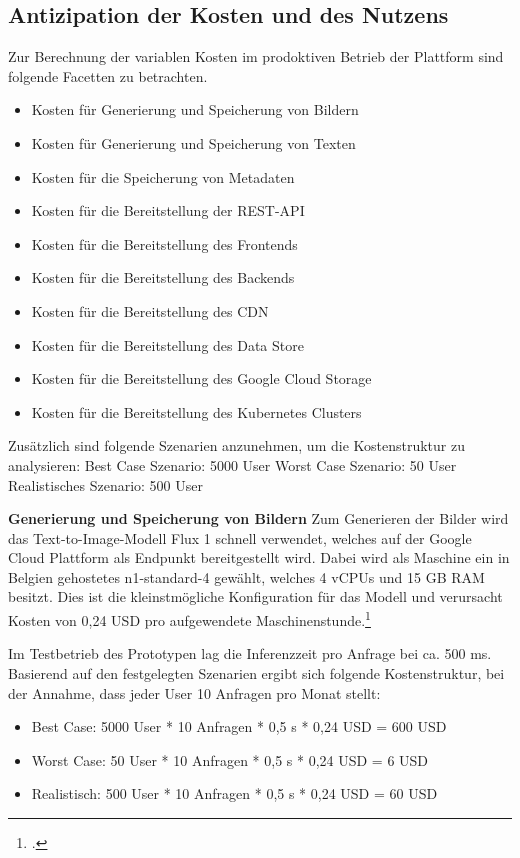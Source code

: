 \subsection{Antizipation der Kosten und des Nutzens}

Zur Berechnung der variablen Kosten im prodoktiven Betrieb der Plattform sind folgende Facetten zu betrachten.

\begin{itemize}
    \item Kosten für Generierung und Speicherung von Bildern
    \item Kosten für Generierung und Speicherung von Texten
    \item Kosten für die Speicherung von Metadaten
    \item Kosten für die Bereitstellung der REST-API
    \item Kosten für die Bereitstellung des Frontends
    \item Kosten für die Bereitstellung des Backends
    \item Kosten für die Bereitstellung des CDN
    \item Kosten für die Bereitstellung des Data Store
    \item Kosten für die Bereitstellung des Google Cloud Storage
    \item Kosten für die Bereitstellung des Kubernetes Clusters
\end{itemize}

Zusätzlich sind folgende Szenarien anzunehmen, um die Kostenstruktur zu analysieren:
Best Case Szenario: 5000 User
Worst Case Szenario: 50 User
Realistisches Szenario: 500 User

\textbf{Generierung und Speicherung von Bildern}
Zum Generieren der Bilder wird das Text-to-Image-Modell Flux 1 schnell verwendet, welches auf der Google Cloud Plattform als Endpunkt bereitgestellt wird.
Dabei wird als Maschine ein in Belgien gehostetes n1-standard-4 gewählt, welches 4 vCPUs und 15 GB RAM besitzt.
Dies ist die kleinstmögliche Konfiguration für das Modell und verursacht Kosten von 0,24 USD pro aufgewendete Maschinenstunde.\footcite{GoogleVertexAI2025}

Im Testbetrieb des Prototypen lag die Inferenzzeit pro Anfrage bei ca. 500 ms.
Basierend auf den festgelegten Szenarien ergibt sich folgende Kostenstruktur, bei der Annahme, dass jeder User 10 Anfragen pro Monat stellt:

\begin{itemize}
    \item Best Case: 5000 User * 10 Anfragen * 0,5 s * 0,24 USD = 600 USD
    \item Worst Case: 50 User * 10 Anfragen * 0,5 s * 0,24 USD = 6 USD
    \item Realistisch: 500 User * 10 Anfragen * 0,5 s * 0,24 USD = 60 USD
\end{itemize}

